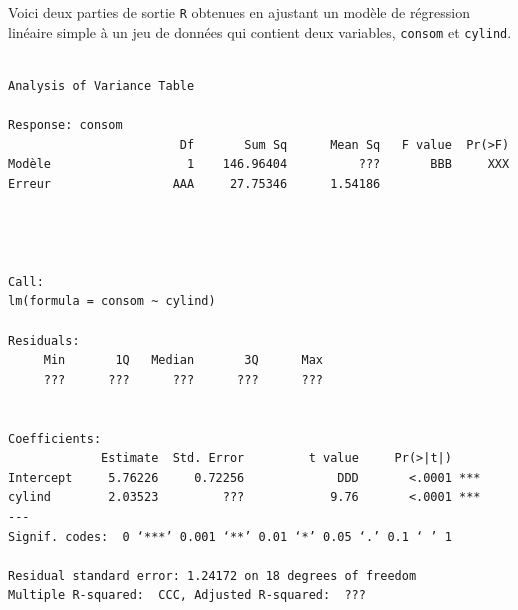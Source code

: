 \begin{questions}
\newpage

\question\label{appli}
Voici deux parties de sortie \texttt{R} obtenues en ajustant un modèle de régression linéaire simple à un jeu de données qui contient deux variables, \texttt{consom} et \texttt{cylind}.

\noindent\makebox[\linewidth]{\rule{\textwidth}{1pt}} 

\footnotesize
\begin{verbatim}

Analysis of Variance Table

Response: consom
                        Df       Sum Sq      Mean Sq   F value  Pr(>F)    
Modèle                   1    146.96404          ???       BBB     XXX
Erreur                 AAA     27.75346      1.54186




Call:
lm(formula = consom ~ cylind)

Residuals:
     Min       1Q   Median       3Q      Max 
     ???      ???      ???      ???      ???


Coefficients:
             Estimate  Std. Error         t value     Pr(>|t|)    
Intercept     5.76226     0.72256             DDD       <.0001 ***
cylind        2.03523         ???            9.76       <.0001 ***
---
Signif. codes:  0 ‘***’ 0.001 ‘**’ 0.01 ‘*’ 0.05 ‘.’ 0.1 ‘ ’ 1

Residual standard error: 1.24172 on 18 degrees of freedom
Multiple R-squared:  CCC, Adjusted R-squared:  ??? 

 \end{verbatim}
 
\normalsize	

\noindent\makebox[\linewidth]{\rule{\textwidth}{1pt}} 

\end{questions}

